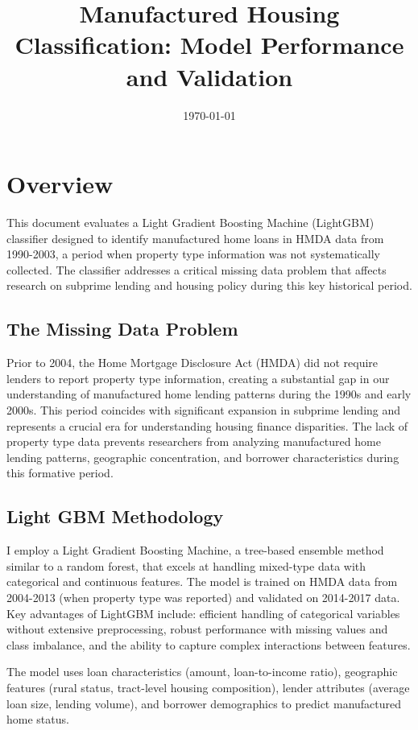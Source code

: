 \documentclass[11pt]{article}
\title{Manufactured Housing Classification: Model Performance and Validation}
\date{\today}
\begin{document}
\maketitle

\section{Overview}

This document evaluates a Light Gradient Boosting Machine (LightGBM) classifier designed to identify manufactured home loans in HMDA data from 1990-2003, a period when property type information was not systematically collected. The classifier addresses a critical missing data problem that affects research on subprime lending and housing policy during this key historical period.

\subsection{The Missing Data Problem}

Prior to 2004, the Home Mortgage Disclosure Act (HMDA) did not require lenders to report property type information, creating a substantial gap in our understanding of manufactured home lending patterns during the 1990s and early 2000s. This period coincides with significant expansion in subprime lending and represents a crucial era for understanding housing finance disparities. The lack of property type data prevents researchers from analyzing manufactured home lending patterns, geographic concentration, and borrower characteristics during this formative period.

\subsection{Light GBM Methodology}

I employ a Light Gradient Boosting Machine, a tree-based ensemble method similar to a random forest, that excels at handling mixed-type data with categorical and continuous features. The model is trained on HMDA data from 2004-2013 (when property type was reported) and validated on 2014-2017 data. Key advantages of LightGBM include: efficient handling of categorical variables without extensive preprocessing, robust performance with missing values and class imbalance, and the ability to capture complex interactions between features.

The model uses loan characteristics (amount, loan-to-income ratio), geographic features (rural status, tract-level housing composition), lender attributes (average loan size, lending volume), and borrower demographics to predict manufactured home status.
\end{document}
